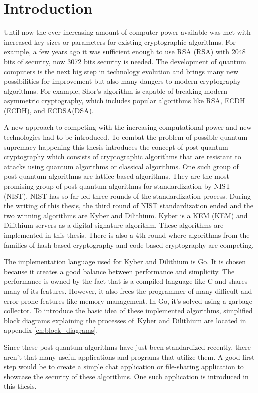 \chapter*{Introduction}
{}

Until now the ever-increasing amount of computer power available was met with increased key sizes or parameters for existing cryptographic algorithms. For example, a few years ago it was sufficient enough to use RSA (\acl{RSA}) with 2048 bits of security, now 3072 bits security is needed. The development of quantum computers is the next big step in technology evolution and brings many new possibilities for improvement but also many dangers to modern cryptography algorithms. For example, Shor's algorithm is capable of breaking modern asymmetric cryptography, which includes popular algorithms like RSA, ECDH (\acl{ECDH}), and ECDSA(\acl{DSA}).

A new approach to competing with the increasing computational power and new technologies had to be introduced. To combat the problem of possible quantum supremacy happening this thesis introduces the concept of post-quantum cryptography which consists of cryptographic algorithms that are resistant to attacks using quantum algorithms or classical algorithms. One such group of post-quantum algorithms are lattice-based algorithms. They are the most promising group of post-quantum algorithms for standardization by NIST (\acl{NIST}). NIST has so far led three rounds of the standardization process. During the writing of this thesis, the third round of NIST standardization ended and the two winning algorithms are Kyber and Dilithium. Kyber is a KEM (\acl{KEM}) and Dilithium servers as a digital signature algorithm. These algorithms are implemented in this thesis. There is also a 4th round where algorithms from the families of hash-based cryptography and code-based cryptography are competing.

The implementation language used for Kyber and Dilithium is Go. It is chosen because it creates a good balance between performance and simplicity. The performance is owned by the fact that is a compiled language like C and shares many of its features. However, it also frees the programmer of many difficult and error-prone features like memory management. In Go, it's solved using a garbage collector. To introduce the basic idea of these implemented algorithms, simplified block diagrams explaining the processes of~Kyber and Dilithium are located in appendix \ref{ch:block_diagrams}.

Since these post-quantum algorithms have just been standardized recently, there aren't that many useful applications and programs that utilize them. A good first step would be to create a simple chat application or file-sharing application to showcase the security of these algorithms. One such application is introduced in this thesis.
